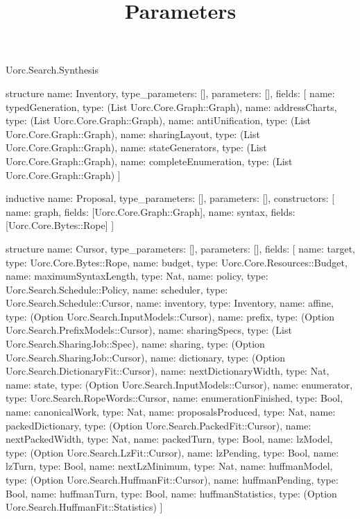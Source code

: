 \begin{lexlean}{Uorc.Search.Synthesis}
\title{Parameters}
\begin{semanticmodule}
structure{
  name: Inventory,
  type_parameters: [],
  parameters: [],
  fields: [
    {name: typedGeneration, type: (List Uorc.Core.Graph::Graph)},
    {name: addressCharts, type: (List Uorc.Core.Graph::Graph)},
    {name: antiUnification, type: (List Uorc.Core.Graph::Graph)},
    {name: sharingLayout, type: (List Uorc.Core.Graph::Graph)},
    {name: stateGenerators, type: (List Uorc.Core.Graph::Graph)},
    {name: completeEnumeration, type: (List Uorc.Core.Graph::Graph)}
  ]
}

inductive{
  name: Proposal,
  type_parameters: [],
  parameters: [],
  constructors: [
    {name: graph, fields: [Uorc.Core.Graph::Graph]},
    {name: syntax, fields: [Uorc.Core.Bytes::Rope]}
  ]
}

structure{
  name: Cursor,
  type_parameters: [],
  parameters: [],
  fields: [
    {name: target, type: Uorc.Core.Bytes::Rope},
    {name: budget, type: Uorc.Core.Resources::Budget},
    {name: maximumSyntaxLength, type: Nat},
    {name: policy, type: Uorc.Search.Schedule::Policy},
    {name: scheduler, type: Uorc.Search.Schedule::Cursor},
    {name: inventory, type: Inventory},
    {name: affine, type: (Option Uorc.Search.InputModels::Cursor)},
    {name: prefix, type: (Option Uorc.Search.PrefixModels::Cursor)},
    {name: sharingSpecs, type: (List Uorc.Search.SharingJob::Spec)},
    {name: sharing, type: (Option Uorc.Search.SharingJob::Cursor)},
    {name: dictionary, type: (Option Uorc.Search.DictionaryFit::Cursor)},
    {name: nextDictionaryWidth, type: Nat},
    {name: state, type: (Option Uorc.Search.InputModels::Cursor)},
    {name: enumerator, type: Uorc.Search.RopeWords::Cursor},
    {name: enumerationFinished, type: Bool},
    {name: canonicalWork, type: Nat},
    {name: proposalsProduced, type: Nat},
    {name: packedDictionary, type: (Option Uorc.Search.PackedFit::Cursor)},
    {name: nextPackedWidth, type: Nat},
    {name: packedTurn, type: Bool},
    {name: lzModel, type: (Option Uorc.Search.LzFit::Cursor)},
    {name: lzPending, type: Bool},
    {name: lzTurn, type: Bool},
    {name: nextLzMinimum, type: Nat},
    {name: huffmanModel, type: (Option Uorc.Search.HuffmanFit::Cursor)},
    {name: huffmanPending, type: Bool},
    {name: huffmanTurn, type: Bool},
    {name: huffmanStatistics, type: (Option Uorc.Search.HuffmanFit::Statistics)}
  ]
}


\end{semanticmodule}
\end{lexlean}
